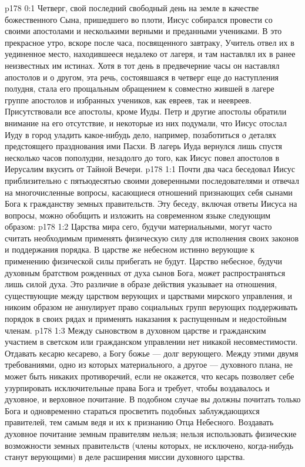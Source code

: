 \author{Комиссия срединников}
\vs p178 0:1 Четверг, свой последний свободный день на земле в качестве божественного Сына, пришедшего во плоти, Иисус собирался провести со своими апостолами и несколькими верными и преданными учениками. В это прекрасное утро, вскоре после часа, посвященного завтраку, Учитель отвел их в уединенное место, находившееся недалеко от лагеря, и там наставлял их в ранее неизвестных им истинах. Хотя в тот день в предвечерние часы он наставлял апостолов и о другом, эта речь, состоявшаяся в четверг еще до наступления полудня, стала его прощальным обращением к совместно жившей в лагере группе апостолов и избранных учеников, как евреев, так и неевреев. Присутствовали все апостолы, кроме Иуды. Петр и другие апостолы обратили внимание на его отсутствие, и некоторые из них подумали, что Иисус отослал Иуду в город уладить какое\hyp{}нибудь дело, например, позаботиться о деталях предстоящего празднования ими Пасхи. В лагерь Иуда вернулся лишь спустя несколько часов пополудни, незадолго до того, как Иисус повел апостолов в Иерусалим вкусить от Тайной Вечери.
\vs p178 1:1 Почти два часа беседовал Иисус приблизительно с пятьюдесятью своими доверенными последователями и отвечал на многочисленные вопросы, касающиеся отношений признающих себя сынами Бога к гражданству земных правительств. Эту беседу, включая ответы Иисуса на вопросы, можно обобщить и изложить на современном языке следующим образом:
\vs p178 1:2 \pc Царства мира сего, будучи материальными, могут часто считать необходимым применять физическую силу для исполнения своих законов и поддержания порядка. В царстве же небесном истинно верующие к применению физической силы прибегать не будут. Царство небесное, будучи духовным братством рожденных от духа сынов Бога, может распространяться лишь силой духа. Это различие в образе действия указывает на отношения, существующие между царством верующих и царствами мирского управления, и никоим образом не аннулирует право социальных групп верующих поддерживать порядок в своих рядах и применять наказания к распущенным и недостойным членам.
\vs p178 1:3 Между сыновством в духовном царстве и гражданским участием в светском или гражданском управлении нет никакой несовместимости. Отдавать кесарю кесарево, а Богу божье --- долг верующего. Между этими двумя требованиями, одно из которых материального, а другое --- духовного плана, не может быть никаких противоречий, если не окажется, что кесарь позволяет себе узурпировать исключительные права Бога и требует, чтобы воздавалось и духовное, и верховное почитание. В подобном случае вы должны почитать только Бога и одновременно стараться просветить подобных заблуждающихся правителей, тем самым ведя и их к признанию Отца Небесного. Воздавать духовное почитание земным правителям нельзя; нельзя использовать физические возможности земных правительств (члены которых, не исключено, когда\hyp{}нибудь станут верующими) в деле расширения миссии духовного царства.
